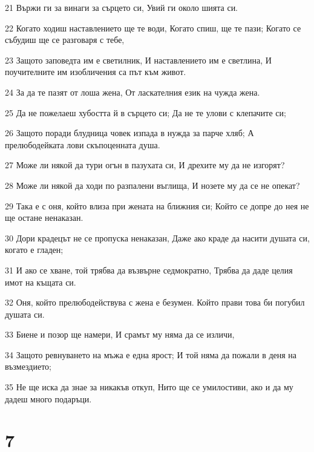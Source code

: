 \par 21 Вържи ги за винаги за сърцето си, Увий ги около шията си.
\par 22 Когато ходиш наставлението ще те води, Когато спиш, ще те пази; Когато се събудиш ще се разговаря с тебе,
\par 23 Защото заповедта им е светилник, И наставлението им е светлина, И поучителните им изобличения са път към живот.
\par 24 За да те пазят от лоша жена, От ласкателния език на чужда жена.
\par 25 Да не пожелаеш хубостта й в сърцето си; Да не те улови с клепачите си;
\par 26 Защото поради блудница човек изпада в нужда за парче хляб; А прелюбодейката лови скъпоценната душа.
\par 27 Може ли някой да тури огън в пазухата си, И дрехите му да не изгорят?
\par 28 Може ли някой да ходи по разпалени въглища, И нозете му да се не опекат?
\par 29 Така е с оня, който влиза при жената на ближния си; Който се допре до нея не ще остане ненаказан.
\par 30 Дори крадецът не се пропуска ненаказан, Даже ако краде да насити душата си, когато е гладен;
\par 31 И ако се хване, той трябва да възвърне седмократно, Трябва да даде целия имот на къщата си.
\par 32 Оня, който прелюбодействува с жена е безумен. Който прави това би погубил душата си.
\par 33 Биене и позор ще намери, И срамът му няма да се изличи,
\par 34 Защото ревнуването на мъжа е една ярост; И той няма да пожали в деня на възмездието;
\par 35 Не ще иска да знае за никакъв откуп, Нито ще се умилостиви, ако и да му дадеш много подаръци.

\chapter{7}

